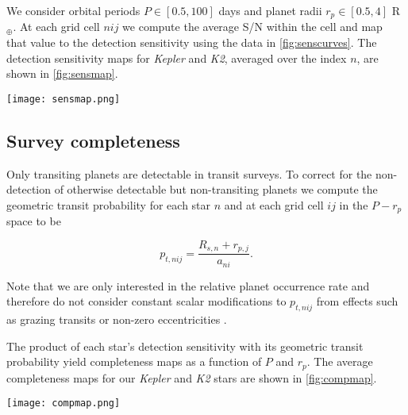 \documentclass[twocolumn]{emulateapj}
\newcommand{\kepler}[1]{\emph{Kepler}#1}
\newcommand{\ktwo}[1]{\emph{K2}#1}
\begin{document}
We consider orbital periods $P \in [0.5,100]$ days and planet radii $r_p \in [0.5,4]$ R$_{\oplus}$. At
each grid cell $nij$ we compute the average S/N within the cell and map that value to the detection sensitivity
using the data in \autoref{fig:senscurves}. The detection sensitivity maps for \kepler{} and \ktwo{,}
averaged over the index $n$, are shown in \autoref{fig:sensmap}.

 

\begin{figure*}
  \centering
  \texttt{[image: sensmap.png]}
  \caption{Average detection sensitivity versus orbital period and planetary radius.
    The detection sensitivity maps averaged over \kepler{} stars (\emph{left panel)} and over \ktwo{} stars
    (\emph{right panel}) from our sample of low mass dwarf stars.} 
  \label{fig:sensmap}
\end{figure*}


\subsection{Survey completeness} \label{sect:comp}
Only transiting planets are detectable in transit surveys. To correct for the non-detection of otherwise
detectable but non-transiting planets we compute
the geometric transit probability for each star $n$ and at each grid cell $ij$ in the $P-r_p$ space to be

\begin{equation}
  p_{t,nij} = \frac{R_{s,n} + r_{p,j}}{a_{ni}}. \label{eq:ptransit}
\end{equation}

\noindent Note that we are only interested in the relative planet occurrence rate and therefore do not consider
constant scalar modifications to $p_{t,nij}$ from effects such as grazing transits or non-zero eccentricities 
\citep{barnes07b}.

The product of each star's detection sensitivity with its geometric transit probability yield completeness
maps as a function of $P$ and $r_p$. The average completeness maps for our \kepler{} and \ktwo{} stars are
shown in \autoref{fig:compmap}.

\begin{figure*}
  \centering
  \texttt{[image: compmap.png]}
  \caption{Average completeness versus orbital period and planetary radius.
    Maps of the product of the detection sensitivity and geometric transit probability averaged over \kepler{} stars
    (\emph{left panel)} and over \ktwo{} stars (\emph{right panel}) from our sample of low mass dwarf stars.} 
  \label{fig:compmap}
\end{figure*}
\end{document}
